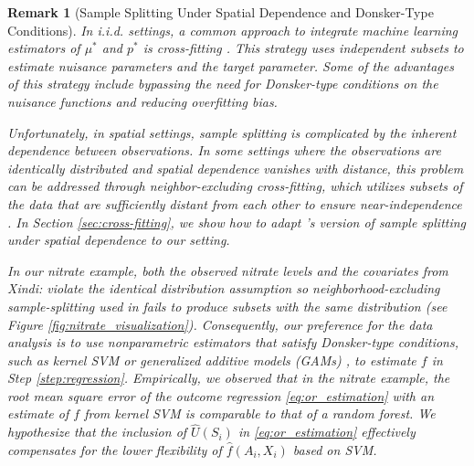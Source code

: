 \documentclass[12pt]{article}
\newtheorem{remark}{Remark}
\newcommand{\XL}[1]{{\color{blue}from Xindi: #1}}
\begin{document}
\begin{remark}[Sample Splitting Under Spatial Dependence and Donsker-Type Conditions]
In i.i.d. settings, a common approach to integrate machine learning estimators of $\mu^*$ and $p^*$ is cross-fitting \citep{chernozhukov2018double}. This strategy uses independent subsets to estimate nuisance parameters and the target parameter. Some of the advantages of this strategy include bypassing the need for Donsker-type conditions on the nuisance functions and reducing overfitting bias. 

Unfortunately, in spatial settings, sample splitting is complicated by the inherent dependence between observations. In some settings where the observations are identically distributed and spatial dependence vanishes with distance, this problem
can be addressed through neighbor-excluding cross-fitting, which utilizes subsets of the data that are sufficiently distant from each other to ensure near-independence \citep{gilbert2021causal, semenova2023inference}. In Section \ref{sec:cross-fitting}, we show how to adapt \citet{gilbert2021causal}'s version of sample splitting under spatial dependence to our setting.


In our nitrate example, both the observed nitrate levels and the covariates \XL{violate the identical distribution assumption so neighborhood-excluding sample-splitting used in \citet{gilbert2021causal} fails to produce subsets with the same distribution} (see Figure \ref{fig:nitrate_visualization}). Consequently, our preference for the data analysis is to use nonparametric estimators that satisfy Donsker-type conditions, such as kernel SVM \citep{christmann2008support} or generalized additive models (GAMs) \citep{gam}, to estimate $f$ in Step \ref{step:regression}. Empirically, we observed that in the nitrate example, the root mean square error of the outcome regression \eqref{eq:or_estimation} with an estimate of $f$ from kernel SVM is comparable to that of a random forest. We hypothesize that the inclusion of $\widehat U(S_i)$ in \eqref{eq:or_estimation} effectively compensates for the lower flexibility of $\widehat f(A_i, X_i)$ based on SVM. 
\end{remark}
\end{document}
